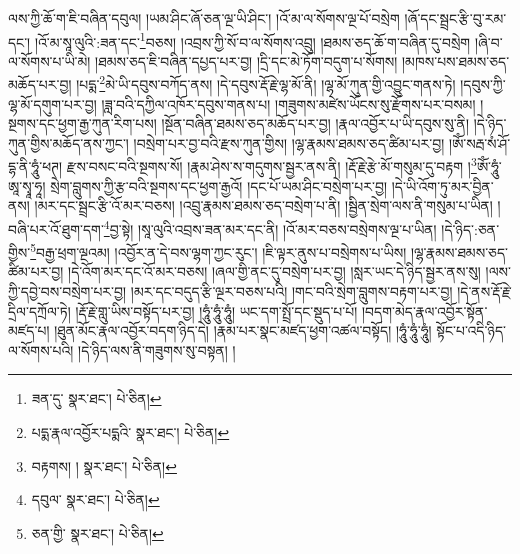 ལས་ཀྱི་ཆོ་ག་ཇི་བཞིན་དབུལ། །ཡམ་ཤིང་ཞོ་ཅན་ལྔ་ཡི་ཤིང་། །འོ་མ་ལ་སོགས་ལྔ་པོ་བསྲེག །ཞོ་དང་སྦྲང་རྩི་བུ་རམ་དང་། །འོ་མ་སཱ་ལུའི་:ཟན་དང་\footnote{ཟན་དུ་  སྣར་ཐང་།  པེ་ཅིན། }བཅས། །འབྲས་ཀྱི་སོ་བ་ལ་སོགས་འབྲུ། །ཐམས་ཅད་ཆོ་ག་བཞིན་དུ་བསྲེག །ཞི་བ་ལ་སོགས་པ་ཡི་མེ། །ཐམས་ཅད་ཇི་བཞིན་དཔྱད་པར་བྱ། །དྲི་དང་མེ་ཏོག་བདུག་པ་སོགས། །མཁས་པས་ཐམས་ཅད་མཆོད་པར་བྱ། །པདྨ་\footnote{པདྨ་རྣལ་འབྱོར་པདྨའི་  སྣར་ཐང་།  པེ་ཅིན། }མེ་ཡི་དབུས་བཀོད་ནས། །དེ་དབུས་རྡོ་རྗེ་ལྷ་མོ་ནི། །ལྷ་མོ་ཀུན་གྱི་འབྱུང་གནས་ཏེ། །དབུས་ཀྱི་ལྷ་མོ་དགུག་པར་བྱ། །ཟླ་བའི་དཀྱིལ་འཁོར་དབུས་གནས་པ། །གཟུགས་མཛེས་ཡོངས་སུ་རྫོགས་པར་བསམ། །སྔགས་དང་ཕྱག་རྒྱ་ཀུན་རིག་པས། །སྔོན་བཞིན་ཐམས་ཅད་མཆོད་པར་བྱ། །རྣལ་འབྱོར་པ་ཡི་དབུས་སུ་ནི། །དེ་ཉིད་ཀུན་གྱིས་མཆོད་ནས་ཀྱང་། །བསྲེག་པར་བྱ་བའི་རྫས་ཀུན་གྱིས། །ལྷ་རྣམས་ཐམས་ཅད་ཚིམ་པར་བྱ། །ཨོཾ་སརྦ་སཾ་ཤོ་དྷ་ནི་ཧཱུཾ་ཕཊ། རྫས་བསང་བའི་སྔགས་སོ། །རྣམ་ཤེས་ས་གདུགས་སྦྱར་ནས་ནི། །རྡོ་རྗེ་རྩེ་མོ་གསུམ་དུ་བརྟག །\footnote{བརྟགས། །  སྣར་ཐང་།  པེ་ཅིན། }ཨོཾ་ཧཱུཾ་ཨཱ་སྭཱ་ཧཱ། སྲེག་བླུགས་ཀྱི་རྩ་བའི་སྔགས་དང་ཕྱག་རྒྱའོ། །དང་པོ་ཡམ་ཤིང་བསྲེག་པར་བྱ། །དེ་ཡི་འོག་ཏུ་མར་བྱིན་ནས། །མར་དང་སྦྲང་རྩི་འོ་མར་བཅས། །འབྲུ་རྣམས་ཐམས་ཅད་བསྲེག་པ་ནི། །སྦྱིན་སྲེག་ལས་ནི་གསུམ་པ་ཡིན། །བཞི་པར་འོ་ཐུག་དག་\footnote{དབུལ་  སྣར་ཐང་།  པེ་ཅིན། }བྱ་སྟེ། །སཱ་ལུའི་འབྲས་ཟན་མར་དང་ནི། །འོ་མར་བཅས་བསྲེགས་ལྔ་པ་ཡིན། །དེ་ཉིད་:ཅན་གྱིས་\footnote{ཅན་གྱི་  སྣར་ཐང་།  པེ་ཅིན། }བརྒྱ་ཕྲག་ལྔའམ། །འབྱོར་ན་དེ་བས་ལྷག་ཀྱང་རུང་། །ཇི་ལྟར་ནུས་པ་བསྲེགས་པ་ཡིས། །ལྷ་རྣམས་ཐམས་ཅད་ཚིམ་པར་བྱ། །དེ་འོག་མར་དང་འོ་མར་བཅས། །ཞལ་གྱི་ནང་དུ་བསྲེག་པར་བྱ། །སླར་ཡང་དེ་ཉིད་སྦྱར་ནས་སུ། །ལས་ཀྱི་དབྱེ་བས་བསྲེག་པར་བྱ། །མར་དང་བདུད་རྩི་ལྔར་བཅས་པའི། །གང་བའི་སྲེག་བླུགས་བརྟག་པར་བྱ། །དེ་ནས་རྡོ་རྗེ་དྲིལ་དཀྲོལ་ཏེ། །རྡོ་རྗེ་གླུ་ཡིས་བསྟོད་པར་བྱ། །ཧཱུཾ་ཧཱུཾ་ཧཱུཾ། ཡང་དག་སྤྲོ་དང་སྡུད་པ་པོ། །བདག་མེད་རྣལ་འབྱོར་སྟོན་མཛད་པ། །ཐུན་མོང་རྣལ་འབྱོར་བདག་ཉིད་དེ། །རྣམ་པར་སྣང་མཛད་ཕྱག་འཚལ་བསྟོད། །ཧཱུཾ་ཧཱུཾ་ཧཱུཾ། སྟོང་པ་འདི་ཉིད་ལ་སོགས་པའི། །དེ་ཉིད་ལས་ནི་གཟུགས་སུ་བསྟན། །
